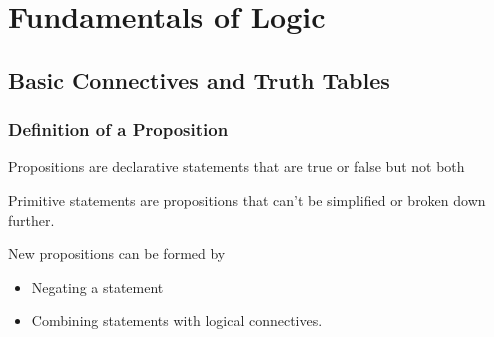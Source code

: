\documentclass[../../../main.tex]{subfiles}
\begin{document}
\chapter{Fundamentals of Logic}
\label{chap:logic}

\section{Basic Connectives and Truth Tables}

\subsection{Definition of a Proposition}
\begin{definition}[Propositions]
Propositions are declarative statements that are true or false but not both
\end{definition}
    
\begin{definition}[Primitives]
Primitive statements are propositions that can't be simplified or broken down further.
\end{definition}

New propositions can be formed by
\begin{itemize}
    \item Negating a statement
    \item Combining statements with logical connectives.
\end{itemize}
\end{document}
